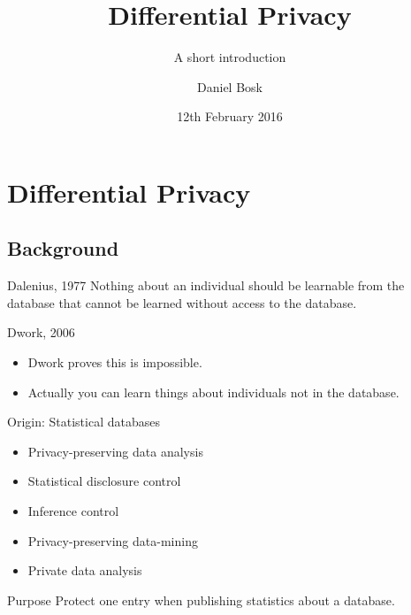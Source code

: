 \title{Differential Privacy}
\subtitle{A short introduction}
\author[D. Bosk <dbosk@kth.se>]{Daniel Bosk}
\date{12th February 2016}

\maketitle

\mode*

\begin{abstract}
  
\end{abstract}


\section{Differential Privacy}

\subsection{Background}

\begin{frame}
  \begin{block}{Dalenius, 1977}
    Nothing about an individual should be learnable from the database that 
    cannot be learned without access to the database.
  \end{block}

  \pause{}

  \begin{block}{Dwork, 2006}
    \begin{itemize}
      \item Dwork proves this is impossible.
      \item Actually you can learn things about individuals not in the 
        database.
    \end{itemize}
  \end{block}
\end{frame}

\begin{frame}
  \begin{block}{Origin: Statistical databases}
    \begin{itemize}
      \item Privacy-preserving data analysis
      \item Statistical disclosure control
      \item Inference control
      \item Privacy-preserving data-mining
      \item Private data analysis
    \end{itemize}
  \end{block}

  \pause{}

  \begin{block}{Purpose}
    Protect one entry when publishing statistics about a database.
  \end{block}
\end{frame}

